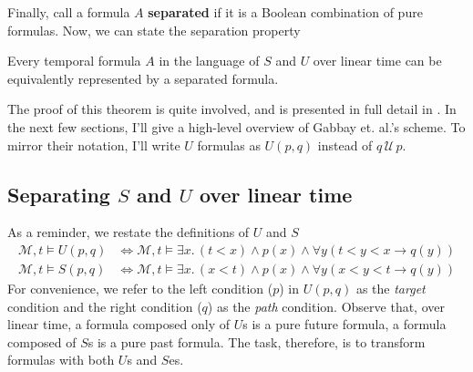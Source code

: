 \documentclass[a4paper,UKenglish,cleveref, autoref, thm-restate, numberwithinsect]{lipics-v2021}
\begin{document}
Finally, call a formula $A$ \textbf{separated} if it is a Boolean combination of pure formulas. Now, we can state the separation property
\begin{theorem}
    \label{theorem:separation-property-linear-time}
    Every temporal formula $A$ in the language of $S$ and $U$ over linear time can be equivalently represented by a separated formula.
\end{theorem}

The proof of this theorem is quite involved, and is presented in full detail in \cite{gabbay1994}. In the next few sections, I'll give a high-level overview of Gabbay et. al.'s scheme. To mirror their notation, I'll write $U$ formulas as $U(p, q)$ instead of $q \,\mathcal{U}\, p$.

\subsection{Separating $S$ and $U$ over linear time}

As a reminder, we restate the definitions of $U$ and $S$
\begin{equation*}
    \begin{aligned}
        \mathcal{M}, t \vDash U(p, q) &\Longleftrightarrow \mathcal{M}, t \vDash \exists x.\, (t < x) \land p(x) \land \forall y \left( t < y < x \to q\left( y \right) \right)\\
        \mathcal{M}, t \vDash S(p, q) &\Longleftrightarrow \mathcal{M}, t \vDash \exists x.\, (x < t) \land p(x) \land \forall y \left( x < y < t \to q\left( y \right) \right)
    \end{aligned}
\end{equation*}
For convenience, we refer to the left condition ($p$) in $U(p, q)$ as the \textit{target} condition and the right condition ($q$) as the \textit{path} condition. Observe that, over linear time, a formula composed only of $U$s is a pure future formula, a formula composed of $S$s is a pure past formula. The task, therefore, is to transform formulas with both $U$s and $S$es.
\end{document}
